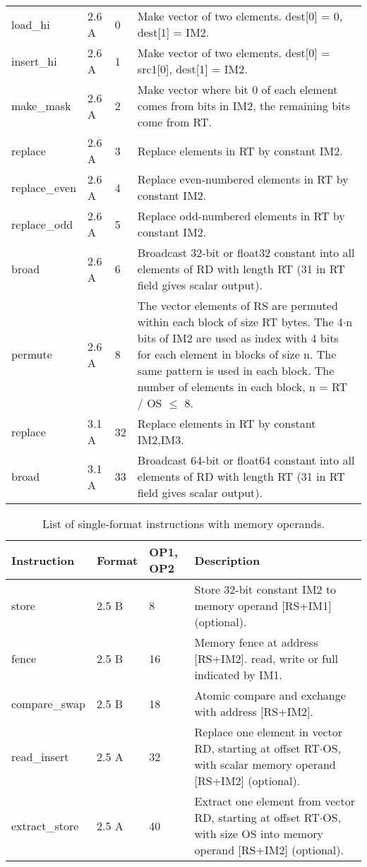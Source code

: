 \documentclass[forwardcom.tex]{subfiles}
\begin{document}
\begin{longtable} {|p{25mm}|p{14mm}|p{10mm}|p{95mm}|}
load\_hi      & 2.6 A & 0 & Make vector of two elements. dest[0] = 0, dest[1] = IM2. \\
insert\_hi    & 2.6 A & 1 & Make vector of two elements. dest[0] = src1[0], dest[1] = IM2. \\
make\_mask    & 2.6 A & 2 & Make vector where bit 0 of each element comes from bits in IM2, the remaining bits come from RT. \\
replace       & 2.6 A & 3 & Replace elements in RT by constant IM2. \\
replace\_even & 2.6 A & 4 & Replace even-numbered elements in RT by constant
IM2. \\
replace\_odd  & 2.6 A & 5 & Replace odd-numbered elements in RT by constant
IM2. \\
broad         & 2.6 A & 6 & Broadcast 32-bit or float32 constant into all elements of RD with length RT (31 in RT field gives scalar output). \\
permute       & 2.6 A & 8 & The vector elements of RS are permuted within each block of size RT bytes. The 4$\cdot$n bits of IM2 are used as index with 4 bits for
each element in blocks of size n. The same pattern is used in each
block. The number of elements in each block, n = RT / OS $\leq$ 8. \\
replace       & 3.1 A & 32 & Replace elements in RT by constant IM2,IM3. \\
broad         & 3.1 A & 33 & Broadcast 64-bit or float64 constant into all elements of RD with length RT (31 in RT field gives scalar output). \\
\hline
\end{longtable}

\begin{longtable} {|p{25mm}|p{14mm}|p{10mm}|p{95mm}|}
\caption{List of single-format instructions with memory operands.} 
\label{table:ListOfSingleFormatInstructionsMemory} \\
\endfirsthead
\endhead
\hline
\bfseries Instruction & \bfseries Format &\bfseries OP1, OP2 & \bfseries Description \\
\hline
store         & 2.5 B &  8 & Store 32-bit constant IM2 to memory operand [RS+IM1] (optional). \\

fence         & 2.5 B & 16 & Memory fence at address [RS+IM2]. read, write or full indicated by IM1.\\

compare\_swap & 2.5 B & 18 & Atomic compare and exchange with address [RS+IM2].\\

read\_insert  & 2.5 A & 32 & Replace one element in vector RD, starting at offset 
RT$\cdot$OS, with scalar memory operand [RS+IM2] (optional).  \\

extract\_store& 2.5 A & 40 & Extract one element from vector RD, starting at offset RT$\cdot$OS, with size OS into memory operand [RS+IM2] (optional). \\

\hline
\end{longtable}
\vspace{4mm}
\end{document}

